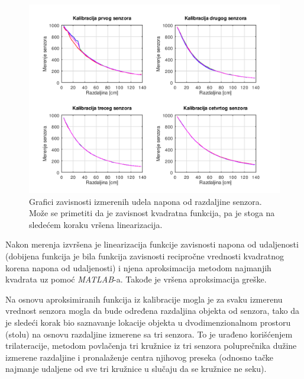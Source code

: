 \documentclass{article}
\begin{document}
    \begin{figure}[H]
        \centering
        \includegraphics[scale=0.6]{kalibracija.png}
        \caption{Grafici zavisnosti izmerenih udela napona od razdaljine senzora. Može se primetiti da je zavisnost kvadratna funkcija, pa je stoga na sledećem koraku vršena linearizacija.}
        \label{Kalibracija}
    \end{figure}

    Nakon merenja izvršena je linearizacija funkcije zavisnosti napona od udaljenosti (dobijena funkcija je bila funkcija zavisnosti recipročne vrednosti kvadratnog korena napona od udaljenosti) i njena aproksimacija metodom najmanjih kvadrata uz pomoć \textit{MATLAB}-a. Takođe je vršena aproksimacija greške. %

    Na osnovu aproksimiranih funkcija iz kalibracije mogla je za svaku izmerenu vrednost senzora mogla da bude određena razdaljina objekta od senzora, tako da je sledeći korak bio saznavanje lokacije objekta u dvodimenzionalnom prostoru (stolu) na osnovu razdaljine izmerene sa tri senzora. To je urađeno korišćenjem trilateracije, metodom povlačenja tri kružnice iz tri senzora poluprečnika dužine izmerene razdaljine i pronalaženje centra njihovog preseka (odnosno tačke najmanje udaljene od sve tri kružnice u slučaju da se kružnice ne seku).
\end{document}
